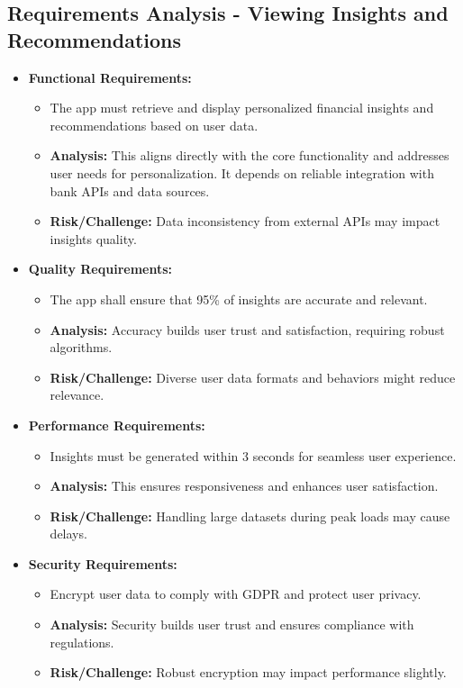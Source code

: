 \subsection{Requirements Analysis - Viewing Insights and Recommendations}
\begin{itemize}
    \item \textbf{Functional Requirements:}
    \begin{itemize}
        \item The app must retrieve and display personalized financial insights and recommendations based on user data.
        \item \textbf{Analysis:} This aligns directly with the core functionality and addresses user needs for personalization. It depends on reliable integration with bank APIs and data sources.
        \item \textbf{Risk/Challenge:} Data inconsistency from external APIs may impact insights quality.
    \end{itemize}
    
    \item \textbf{Quality Requirements:}
    \begin{itemize}
        \item The app shall ensure that 95\% of insights are accurate and relevant.
        \item \textbf{Analysis:} Accuracy builds user trust and satisfaction, requiring robust algorithms.
        \item \textbf{Risk/Challenge:} Diverse user data formats and behaviors might reduce relevance.
    \end{itemize}
    
    \item \textbf{Performance Requirements:}
    \begin{itemize}
        \item Insights must be generated within 3 seconds for seamless user experience.
        \item \textbf{Analysis:} This ensures responsiveness and enhances user satisfaction.
        \item \textbf{Risk/Challenge:} Handling large datasets during peak loads may cause delays.
    \end{itemize}
    
    \item \textbf{Security Requirements:}
    \begin{itemize}
        \item Encrypt user data to comply with GDPR and protect user privacy.
        \item \textbf{Analysis:} Security builds user trust and ensures compliance with regulations.
        \item \textbf{Risk/Challenge:} Robust encryption may impact performance slightly.
    \end{itemize}
    

\end{itemize}
